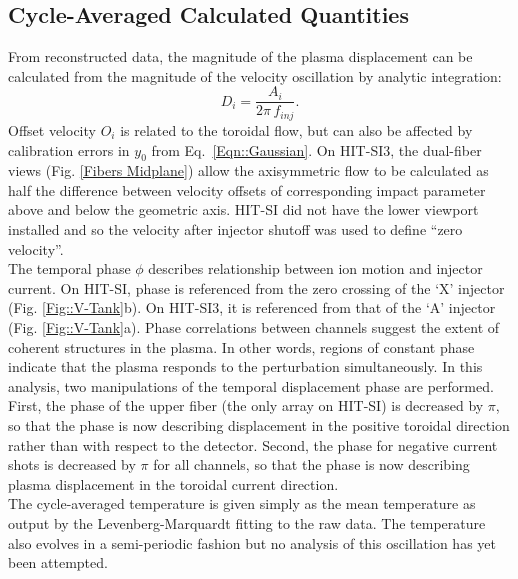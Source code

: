 	\subsection{Cycle-Averaged Calculated Quantities}\label{sec::CalcQuant}
	From reconstructed data, the magnitude of the plasma displacement can be calculated from the magnitude of the velocity oscillation by analytic integration:
	\begin{equation}
	D_i=\frac{A_i}{{2\pi}\,f_{inj}}.
	\end{equation}
	Offset velocity $O_i$ is related to the toroidal flow, but can also be affected by calibration errors in $y_0$ from Eq.~\ref{Eqn::Gaussian}. On HIT-SI3, the dual-fiber views (Fig. \ref{Fibers Midplane}) allow the axisymmetric flow to be calculated as half the difference between velocity offsets of corresponding impact parameter above and below the geometric axis. HIT-SI did not have the lower viewport installed and so the velocity after injector shutoff was used to define ``zero velocity''.\\
	\hspace*{4ex}The temporal phase $\phi$ describes relationship between ion motion and injector current. On HIT-SI, phase is referenced from the zero crossing of the `X' injector (Fig. \ref{Fig::V-Tank}b). On HIT-SI3, it is referenced from that of the `A' injector (Fig. \ref{Fig::V-Tank}a). Phase correlations between channels suggest the extent of coherent structures in the plasma. In other words, regions of constant phase indicate that the plasma responds to the perturbation simultaneously.  In this analysis, two manipulations of the temporal displacement phase are performed. First, the phase of the upper fiber (the only array on HIT-SI) is decreased by $\pi$, so that the phase is now describing displacement in the positive toroidal direction rather than with respect to the detector. Second, the phase for negative current shots is decreased by $\pi$ for all channels, so that the phase is now describing plasma displacement in the toroidal current direction.   \\
	\hspace*{4ex}The cycle-averaged temperature is given simply as the mean temperature as output by the Levenberg-Marquardt fitting to the raw data. The temperature also evolves in a semi-periodic fashion but no analysis of this oscillation has yet been attempted.

